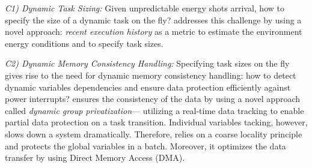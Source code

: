 

\noindent\emph{C1) Dynamic Task Sizing:} Given unpredictable energy shots arrival, how to specify the size of a dynamic task on the fly? \sys addresses this challenge by using a novel approach: \textit{recent execution history} as a metric to estimate the environment energy conditions and to specify task sizes. 

\noindent\emph{C2) Dynamic Memory Consistency Handling:} Specifying task sizes on the fly gives rise to the need for dynamic memory consistency handling: how to detect dynamic variables dependencies and ensure data protection efficiently against power interrupts? \sys ensures the consistency of the data by using a novel
approach called \emph{dynamic group privatization}--- %
utilizing a real-time data tracking to enable partial data protection on a task transition. Individual variables tacking, however, slows down a system dramatically. Therefore, \sys  relies on a coarse locality principle and protects the global variables in a batch. Moreover, it optimizes the data transfer by using Direct Memory Access (DMA).

